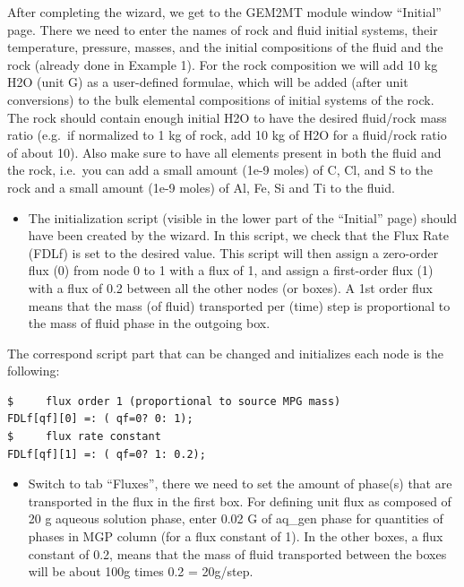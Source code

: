 \documentclass[
]{book}
\providecommand{\tightlist}{%
  \setlength{\itemsep}{0pt}\setlength{\parskip}{0pt}}
\begin{document}
After completing the wizard, we get to the GEM2MT module window ``Initial'' page. There we need to enter the names of rock and fluid initial systems, their temperature, pressure, masses, and the initial compositions of the fluid and the rock (already done in Example 1). For the rock composition we will add 10 kg H2O (unit G) as a user-defined formulae, which will be added (after unit conversions) to the bulk elemental compositions of initial systems of the rock. The rock should contain enough initial H2O to have the desired fluid/rock mass ratio (e.g.~if normalized to 1 kg of rock, add 10 kg of H2O for a fluid/rock ratio of about 10). Also make sure to have all elements present in both the fluid and the rock, i.e.~you can add a small amount (1e-9 moles) of C, Cl, and S to the rock and a small amount (1e-9 moles) of Al, Fe, Si and Ti to the fluid.

\begin{itemize}
\tightlist
\item
  The initialization script (visible in the lower part of the ``Initial'' page) should have been created by the wizard. In this script, we check that the Flux Rate (FDLf) is set to the desired value. This script will then assign a zero-order flux (0) from node 0 to 1 with a flux of 1, and assign a first-order flux (1) with a flux of 0.2 between all the other nodes (or boxes). A 1st order flux means that the mass (of fluid) transported per (time) step is proportional to the mass of fluid phase in the outgoing box.
\end{itemize}

The correspond script part that can be changed and initializes each node is the following:

\begin{verbatim}
$     flux order 1 (proportional to source MPG mass)
FDLf[qf][0] =: ( qf=0? 0: 1);
$     flux rate constant
FDLf[qf][1] =: ( qf=0? 1: 0.2);
\end{verbatim}

\begin{itemize}
\tightlist
\item
  Switch to tab ``Fluxes'', there we need to set the amount of phase(s) that are transported in the flux in the first box. For defining unit flux as composed of 20 g aqueous solution phase, enter 0.02 G of aq\_gen phase for quantities of phases in MGP column (for a flux constant of 1). In the other boxes, a flux constant of 0.2, means that the mass of fluid transported between the boxes will be about 100g times 0.2 = 20g/step.
\end{itemize}
\end{document}
